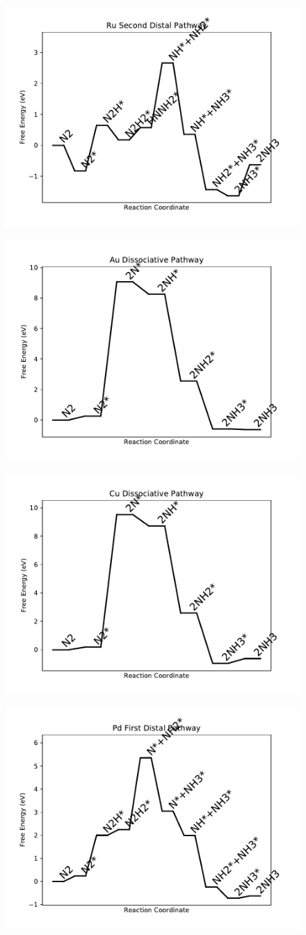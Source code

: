 \documentclass[journal=jacsat,manuscript=article]{achemso}
\begin{document}
\newpage
\begin{figure}
\includegraphics[width=0.5\linewidth]{data/plots/Ru_distal_2.pdf}
\label{fig:Ru_distal_2}
\end{figure}

\begin{figure}
\includegraphics[width=0.5\linewidth]{data/plots/Au_dissociative.pdf}
\label{fig:Au_dissociative}
\end{figure}

\newpage
\begin{figure}
\includegraphics[width=0.5\linewidth]{data/plots/Cu_dissociative.pdf}
\label{fig:Cu_dissociative}
\end{figure}

\begin{figure}
\includegraphics[width=0.5\linewidth]{data/plots/Pd_distal_1.pdf}
\label{fig:Pd_distal_1}
\end{figure}
\end{document}
